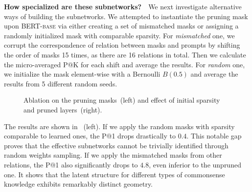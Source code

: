 \noindent
\textbf{How specialized are these subnetworks?}~~We next investigate
alternative ways of building the subnetworks. 
We attempted to instantiate the pruning mask upon \textsc{BERT-base} via 
either creating a set of mismatched masks or 
assigning a randomly initialized mask with comparable sparsity. 
For \textit{mismatched} one, we corrupt the correspondence of relation between masks and prompts by shifting the order of masks 15 times, as there are 16 relations in total. Then we calculate the micro-averaged P@K for each shift and average the results. For \textit{random} one, we initialize the mask element-wise with a Bernoulli $B(0.5)$ and average the results from 5 different random seeds.
\begin{figure}[th]
	\centering
	\caption{Ablation on the pruning masks~(left) and effect of initial sparsity and pruned layers~(right).} \label{fig:both}
\end{figure}
The results are shown in ~(left). If we apply the random masks with sparsity comparable to learned ones, the P@1 drops drastically to $0.4$. This notable gap proves that the effective subnetworks cannot be trivially identified through random weights sampling. If we apply the mismatched masks from other relations, the P@1 also significantly drops to $4.8$, even inferior to the unpruned one. It shows that the latent structure for different types of 
commonsense knowledge exhibits remarkably distinct geometry.


